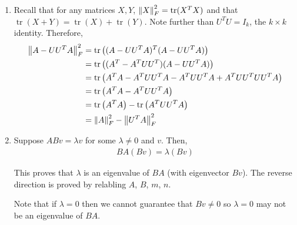 \documentclass[10pt]{article}
\newcommand{\tr}{\operatorname{tr}}
\begin{document}
\begin{solution}[Solution]
\begin{enumerate}[label=(\alph*)]
    \item Recall that for any matrices \( X,Y \), \( \norm{X}_F^2 = \tr(X^T X) \) and that \( \tr(X+Y) = \tr(X) + \tr(Y) \). Note further than \( U^TU = I_k \), the \( k\times k \) identity. Therefore,
        \begin{align*}
            \norm{A-UU^TA}_F^2 &= \tr\left( (A-UU^TA)^T(A-UU^TA) \right)
            \\&= \tr\left( (A^T-A^TUU^T)(A-UU^TA) \right)
            \\&= \tr\left( A^TA -A^TUU^TA-A^TUU^TA + A^TUU^TUU^TA \right)
            \\&= \tr\left( A^TA - A^TUU^TA \right)
            \\&= \tr\left( A^TA \right) - \tr \left(A^TUU^TA \right)
            \\&= \norm{A}_F^2 - \norm{U^TA}_F^2
        \end{align*}
        


    \item Suppose \( AB v = \lambda v \) for some \( \lambda \neq 0 \) and \( v \). Then,
        \begin{align*}
            BA(Bv) = \lambda (Bv)
        \end{align*}

        This proves that \( \lambda \) is an eigenvalue of \( BA \) (with eigenvector \( Bv \)). 
        The reverse direction is proved by relabling \( A \), \( B \), \( m \), \( n \).

        Note that if \( \lambda = 0 \) then we cannot guarantee that \( Bv \neq 0 \) so \( \lambda = 0\) may not be an eigenvalue of \( BA \). 

\end{enumerate}
\end{solution}
\end{document}
